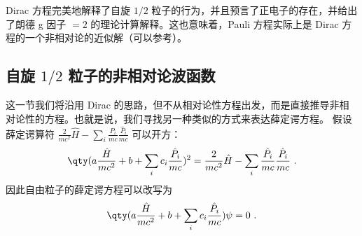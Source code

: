 Dirac 方程完美地解释了自旋 $1/2$ 粒子的行为，并且预言了正电子的存在，并给出了朗德 g 因子 $=2$ 的理论计算解释。这也意味着，Pauli 方程实际上是 Dirac 方程的一个非相对论的近似解（可以参考）。

\subsection{自旋 $1/2$ 粒子的非相对论波函数}
这一节我们将沿用 Dirac 的思路，但不从相对论性方程出发，而是直接推导非相对论性的方程。也就是说，我们寻找另一种类似的方式来表达薛定谔方程。
假设薛定谔算符 $\frac{2}{mc^2} \hat H-\sum_i\frac{P_i}{mc}\frac{\hat P_i}{mc}$ 可以开方：
\begin{equation}
\qty(a\frac{\hat H}{mc^2}+b+\sum_ic_i \frac{\hat P_i}{mc})^2=\frac{2}{mc^2} \hat H-\sum_i\frac{\hat P_i}{mc}\frac{\hat P_i}{mc}~.
\end{equation}
因此自由粒子的薛定谔方程可以改写为
\begin{equation}\label{eq_scheq2_2}
\qty(a\frac{\hat H}{mc^2}+b+\sum_ic_i \frac{\hat P_i}{mc})\psi=0~.
\end{equation}

